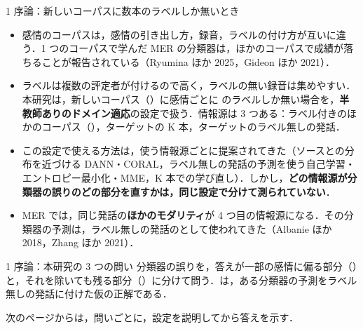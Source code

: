 \begin{frame}{1 序論：新しいコーパスに数本のラベルしか無いとき}
\footnotesize
\begin{itemize}\setlength\itemsep{4pt}
\item 感情のコーパスは，感情の引き出し方，録音，ラベルの付け方が互いに違う．1 つのコーパスで学んだ MER の分類器は，ほかのコーパスで成績が落ちることが報告されている（Ryumina ほか 2025，Gideon ほか 2021）．
\item ラベルは複数の評定者が付けるので高く，ラベルの無い録音は集めやすい．本研究は，新しいコーパス（）に感情ごとに のラベルしか無い場合を，\textbf{半教師ありのドメイン適応}の設定で扱う．情報源は 3 つある：ラベル付きのほかのコーパス（），ターゲットの K 本，ターゲットのラベル無しの発話．
\item この設定で使える方法は，使う情報源ごとに提案されてきた（ソースとの分布を近づける DANN・CORAL，ラベル無しの発話の予測を使う自己学習・エントロピー最小化・MME，K 本での学び直し）．しかし，\textbf{どの情報源が分類器の誤りのどの部分を直すかは，同じ設定で分けて測られていない}．
\item MER では，同じ発話の\textbf{ほかのモダリティ}が 4 つ目の情報源になる．その分類器の予測は，ラベル無しの発話のとして使われてきた（Albanie ほか 2018，Zhang ほか 2021）．
\end{itemize}
\end{frame}

\begin{frame}{1 序論：本研究の 3 つの問い}
\footnotesize
分類器の誤りを，答えが一部の感情に偏る部分（）と，それを除いても残る部分（）に分けて問う．は，ある分類器の予測をラベル無しの発話に付けた仮の正解である．\par\medskip
{}
\vspace{0.3em}
次のページからは，問いごとに，設定を説明してから答えを示す．
\end{frame}


